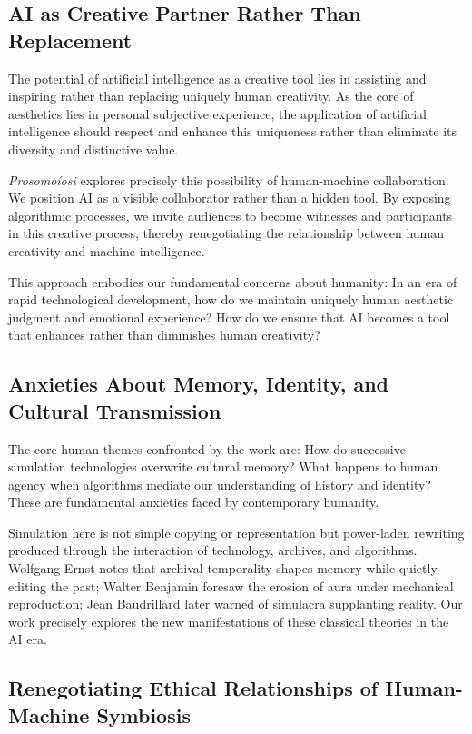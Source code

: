 \documentclass{article}
\begin{document}
\subsection{AI as Creative Partner Rather Than Replacement}

The potential of artificial intelligence as a creative tool lies in assisting and inspiring rather than replacing uniquely human creativity. As the core of aesthetics lies in personal subjective experience, the application of artificial intelligence should respect and enhance this uniqueness rather than eliminate its diversity and distinctive value.

\textit{Prosomoíosi} explores precisely this possibility of human-machine collaboration. We position AI as a visible collaborator rather than a hidden tool. By exposing algorithmic processes, we invite audiences to become witnesses and participants in this creative process, thereby renegotiating the relationship between human creativity and machine intelligence.

This approach embodies our fundamental concerns about humanity: In an era of rapid technological development, how do we maintain uniquely human aesthetic judgment and emotional experience? How do we ensure that AI becomes a tool that enhances rather than diminishes human creativity?

\subsection{Anxieties About Memory, Identity, and Cultural Transmission}

The core human themes confronted by the work are: How do successive simulation technologies overwrite cultural memory? What happens to human agency when algorithms mediate our understanding of history and identity? These are fundamental anxieties faced by contemporary humanity.

Simulation here is not simple copying or representation but power-laden rewriting produced through the interaction of technology, archives, and algorithms. Wolfgang Ernst notes that archival temporality shapes memory while quietly editing the past; Walter Benjamin foresaw the erosion of aura under mechanical reproduction; Jean Baudrillard later warned of simulacra supplanting reality. Our work precisely explores the new manifestations of these classical theories in the AI era.

\subsection{Renegotiating Ethical Relationships of Human-Machine Symbiosis}
\end{document}
